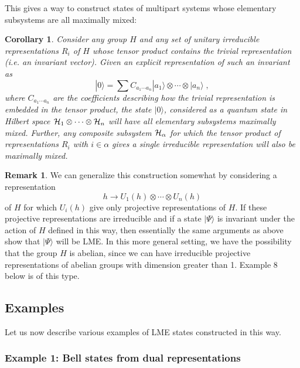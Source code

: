 \documentclass[12pt]{article}
\newtheorem{corollary}[theorem]{Corollary}
\theoremstyle{definition}
\newtheorem{remark}[theorem]{Remark}
\newcommand{\be}{\begin{equation}}
\newcommand{\ee}{\end{equation}}
\begin{document}
This gives a way to construct states of multipart systems whose elementary subsystems are all maximally mixed:
\begin{corollary} \label{cor.genstates}
Consider any group $H$ and any set of unitary irreducible representations $R_i$ of $H$ whose tensor product contains the trivial representation (i.e. an invariant vector). Given an explicit representation of such an invariant as
\be
\label{genstates}
|0 \rangle = \sum C_{a_1 \cdots a_n} |a_1 \rangle  \otimes \cdots  \otimes | a_n \rangle \; ,
\ee
where $C_{a_1 \cdots a_n}$ are the coefficients describing how the trivial representation is embedded in the tensor product, the state $|0 \rangle$, considered as a quantum state in Hilbert space ${\cal H}_1  \otimes \cdots  \otimes {\cal H}_n $ will have all elementary subsystems maximally mixed. Further, any composite subsystem ${\cal H}_{\alpha}$ for which the tensor product of representations $R_i$ with $i \in \alpha$ gives a single irreducible representation will also be maximally mixed.
\end{corollary}

\begin{remark}
We can generalize this construction somewhat by considering a representation 
\be
h \to U_1(h)  \otimes \cdots  \otimes U_n(h)
\ee
of $H$ for which $U_i(h)$ give only projective representations of $H$. If these projective representations are irreducible and if a state $|\Psi\rangle$ is invariant under the action of $H$ defined in this way, then essentially the same arguments as above show that $|\Psi\rangle$ will be LME. In this more general setting, we have the possibility that the group $H$ is abelian, since we can have irreducible projective representations of abelian groups with dimension greater than 1. Example 8 below is of this type.  
\end{remark}

\subsection{Examples}

Let us now describe various examples of LME states constructed in this way.

\subsubsection*{Example 1:  Bell states from dual representations}
\end{document}
